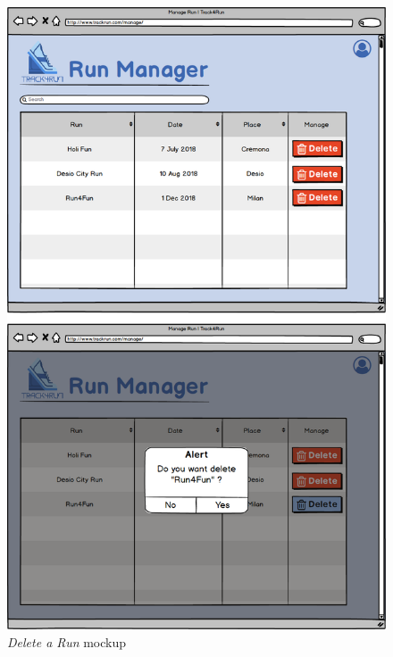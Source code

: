 \begin{figure}[H]
\begin{center}
  \includegraphics[height=0.6\paperheight]{img/mockup/DeleteRun.png}
  \hspace{0.05\linewidth}
  \centering
  \caption{\textit{Delete a Run} mockup}
  \label{img:deleteRunMockup}
\end{center}
\end{figure}
